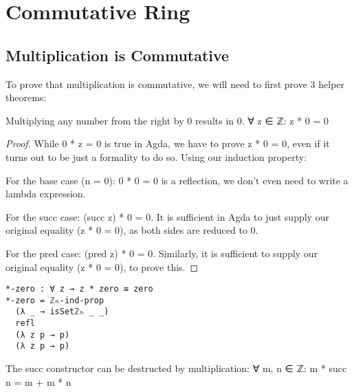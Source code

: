 \chapter{Commutative Ring}
\label{ch:commring}

\section{Multiplication is Commutative}
To prove that multiplication is commutative, we will need to first prove 3 helper theorems:

\begin{theorem}
  Multiplying any number from the right by 0 results in 0. ∀ z ∈ ℤ: z * 0 = 0
\end{theorem}

\begin{proof}
  While 0 * z = 0 is true in Agda, we have to prove z * 0 = 0, even if it turns out to be just a formality to do so. Using our induction property:

  For the base case (n = 0): 0 * 0 = 0 is a reflection, we don't even need to write a lambda expression.

  For the succ case: (succ z) * 0 = 0. It is sufficient in Agda to just supply our original equality (z * 0 = 0), as both sides are reduced to 0.

  For the pred case: (pred z) * 0 = 0. Similarly, it is sufficient to supply our original equality (z * 0 = 0), to prove this.
\end{proof}

\begin{listing}[H]
\begin{verbatim}
*-zero : ∀ z → z * zero ≡ zero
*-zero = ℤₕ-ind-prop
  (λ _ → isSetℤₕ _ _)
  refl
  (λ z p → p)
  (λ z p → p)
\end{verbatim}
\caption{Agda proof of multiplication by 0 from the right is 0}
\end{listing}

\begin{theorem}
  The succ constructor can be destructed by multiplication: ∀ m, n ∈ ℤ: m * succ n = m + m * n
\end{theorem}

